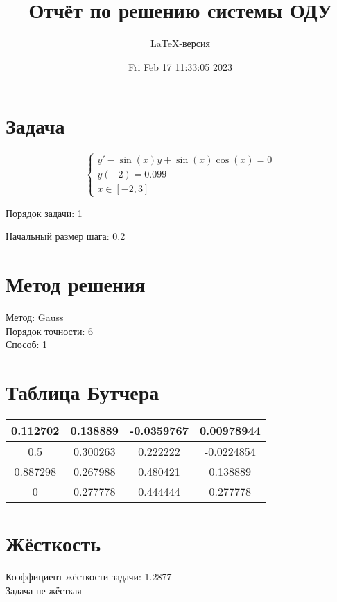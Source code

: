 \documentclass[a4paper,14pt]{extarticle}
\title{Отчёт по решению системы ОДУ}
\author{LaTeX-версия}
\date{Fri Feb 17 11:33:05 2023}
\begin{document}
\maketitle

\tableofcontents
\pagebreak

\section{Задача}

$$
\begin{cases}
	y' - \sin(x)y + \sin(x)\cos(x) = 0\\
	y(-2) = 0.099\\
	x \in [-2, 3]
\end{cases}
$$

Порядок задачи: 1

Начальный размер шага: 0.2

\section{Метод решения}

Метод: Gauss\\
Порядок точности: 6\\
Способ: 1

\section{Таблица Бутчера}

\begin{table}[h]
\centering
\begin{tabular}{|c||c|c|c|}
\hline
0.112702 & 0.138889 & -0.0359767 & 0.00978944\\
\hline
0.5 & 0.300263 & 0.222222 & -0.0224854\\
\hline
0.887298 & 0.267988 & 0.480421 & 0.138889\\
\hline
0 & \cellcolor{lightgray} 0.277778 & \cellcolor{lightgray} 0.444444 & \cellcolor{lightgray} 0.277778\\
\hline
\end{tabular}
\end{table}

\section{Жёсткость}

Коэффициент жёсткости задачи: 1.2877\\
Задача не жёсткая
\end{document}
